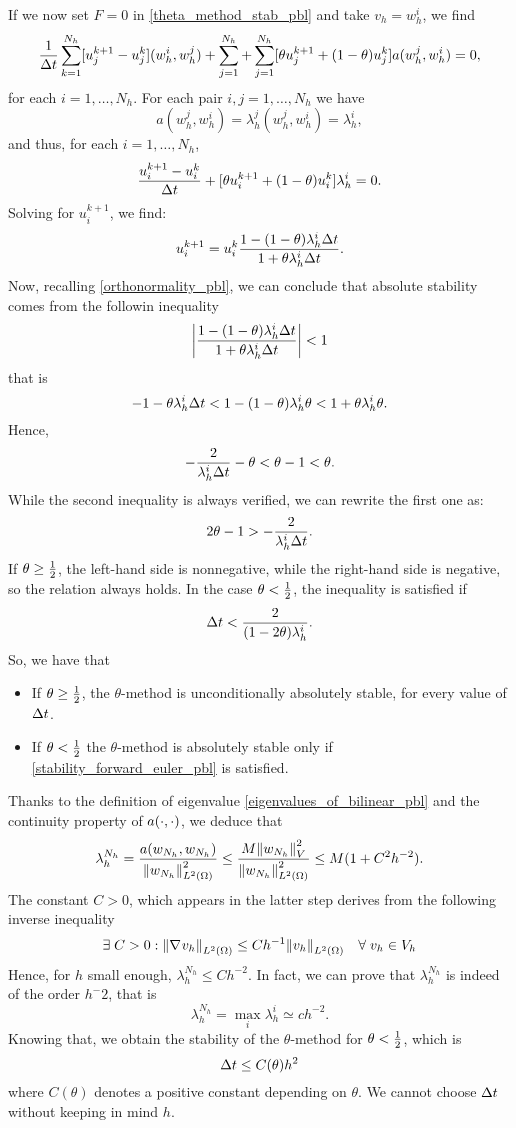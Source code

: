 If we now set \(F=0\) in \eqref{theta_method_stab_pbl} and take \(v_h = w_h^i\), we find 
\[
    \frac{1}{\Delta t} \sum_{k=1}^{N_h} [u_j^{k+1} - u_j^k](w_h^i, w_h^j) + \sum_{j=1}^{N_h} + \sum_{j=1}^{N_h}[\theta u_j^{k+1} + (1-\theta)u_j^k]a(w_h^j, w_h^i) = 0,
\]
for each \(i = 1,\ldots, N_h\). For each pair \(i,j = 1, \ldots, N_h\) we have 
\[
    a(w_h^j, w_h^i) = \lambda^j_h (w_h^j, w_h^i) = \lambda^i_h,
\]
and thus, for each \(i = 1,\ldots, N_h\), 
\[
    \frac{u_i^{k+1} - u^k_i}{\Delta t} + [\theta u^{k+1}_i + (1-\theta)u^k_i] \lambda_h^i = 0.
\]
Solving for \(u^{k+1}_i\), we find:
\[
    u_i^{k+1} = u_i^k \frac{1-(1-\theta) \lambda_h^i \Delta t}{1+\theta \lambda_h^i\Delta t}.
\]
Now, recalling \eqref{orthonormality_pbl}, we can conclude that absolute stability comes from the followin inequality
\[
    \abs{\frac{1-(1-\theta) \lambda_h^i \Delta t}{1+\theta \lambda_h^i\Delta t}} < 1
\]
that is 
\[
    -1-\theta \lambda_h^i \Delta t < 1 - (1-\theta) \lambda_h^i \theta < 1+\theta \lambda_h^i \theta.
\]
Hence, 
\[
    -\frac{2}{\lambda_h^i \Delta t} -\theta < \theta -1 < \theta.
\]
While the second inequality is always verified, we can rewrite the first one as: 
\[
    2\theta - 1 > -\frac{2}{\lambda_h^i \Delta t}. 
\]
If \(\theta \geq \frac{1}{2}\), the left-hand side is nonnegative, while the right-hand side is negative, so the relation always holds. In the case \(\theta < \frac{1}{2}\), the inequality is satisfied if 
\begin{equation}
    \Delta t < \frac{2}{(1-2\theta) \lambda_h^i}.
    \label{stability_forward_euler_pbl}
\end{equation}
So, we have that 
\begin{itemize}
    \item If \(\theta \geq \frac{1}{2}\), the \(\theta\)-method is unconditionally absolutely stable, for every value of \(\Delta t\).
    \item If \(\theta < \frac{1}{2}\) the \(\theta\)-method is absolutely stable only if \eqref{stability_forward_euler_pbl} is satisfied.
\end{itemize}
Thanks to the definition of eigenvalue \eqref{eigenvalues_of_bilinear_pbl} and the continuity property of \(a(\cdot, \cdot)\), we deduce that 
\[
    \lambda_h^{N_h} = \frac{a(w_{N_h}, w_{N_h})}{\norm{w_{N_h}}_{L^2(\Omega)}^2} \leq \frac{M\norm{w_{N_h}}_V^2}{\norm{w_{N_h}}_{L^2(\Omega)}^2} \leq M(1+C^2h^{-2}).
\]
The constant \(C > 0\), which appears in the latter step derives from the following inverse inequality 
\[
    \exists \; C > 0 : \norm{\nabla\mspace{1mu} v_h}_{L^2(\Omega)} \leq Ch^{-1} \norm{v_h}_{L^2(\Omega)} \quad \forall \; v_h \in V_h
\]
Hence, for \(h\) small enough, \(\lambda_h^{N_h} \leq Ch^{-2}\). In fact, we can prove that \(\lambda^{N_h}_h\) is indeed of the order \(h^-2\), that is \
\[
    \lambda_h^{N_h} = \max_i \lambda_h^i \simeq ch^{-2}. 
\]
Knowing that, we obtain the stability of the \(\theta\)-method for \(\theta < \frac{1}{2}\), which is 
\begin{equation}
    \Delta t \leq C(\theta) h^2
    \label{forward_euler_stab_pbl}
\end{equation}
where \(C(\theta)\) denotes a positive constant depending on \(\theta\). We cannot choose \(\Delta t\) without keeping in mind \(h\).

